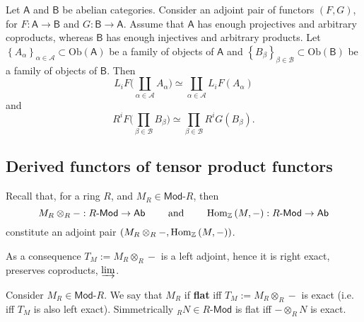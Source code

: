 \begin{prop}
	Let $\mathsf{A}$ and $\mathsf{B}$ be abelian categories.
	Consider an adjoint pair of functors $\left(F, G\right)$,
	for $F: \mathsf{A} \to \mathsf{B}$ and $G: \mathsf{B} \to \mathsf{A}$.
	Assume that $\mathsf{A}$ has enough projectives and arbitrary coproducts,
	whereas $\mathsf{B}$ has enough injectives and arbitrary products.
	Let $\left\{ A_\alpha \right\}_{\alpha \in \mathcal{A}} \subset \mathrm{Ob} \left(\mathsf{A}\right)$
	be a family of objects of $\mathsf{A}$
	and $\left\{ B_\beta \right\}_{\beta \in \mathcal{B}} \subset \mathrm{Ob} \left(\mathsf{B}\right)$
	be a family of objects of $\mathsf{B}$.
	Then
	\begin{equation}
		L_iF \bigg( \coprod_{\alpha \in \mathcal{A}} A_\alpha \bigg) \simeq
		\coprod_{\alpha \in \mathcal{A}} L_i F(A_\alpha)
	\end{equation} 
	and
	\begin{equation}
		R^iF \bigg( \prod_{\beta \in \mathcal{B}} B_\beta \bigg) \simeq
		\prod_{\beta \in \mathcal{B}} R^iG \left( B_\beta \right)
	.\end{equation} 
\end{prop} 

\subsection{Derived functors of tensor product functors}
Recall that, for a ring $R$, and $M_R \in \mathsf{Mod}\text{-}R$,
then 
\begin{equation}
M_R \otimes_R - : R\text{-}\mathsf{Mod} \to \mathsf{Ab}
\qquad \text{ and } \qquad
\mathrm{Hom}_{\mathbb{Z}}\left( M, - \right): R\text{-}\mathsf{Mod} \to \mathsf{Ab}
\end{equation} 
constitute an adjoint pair $\left(M_R \otimes_R -, \mathrm{Hom}_{ \mathbb{Z}}\left( M, - \right)\right)$.

As a consequence $T_M := M_R \otimes_R -$ is a left adjoint, hence it is
right exact, preserves coproducts, $\varinjlim$.

\begin{defn}
	Consider $M_R \in \mathsf{Mod}\text{-}R$.
	We say that $M_R$ if \textbf{flat} iff $T_M := M_R \otimes_R -$ is exact
	(i.e. iff $T_M$ is also left exact).
	Simmetrically ${}_RN \in R\text{-}\mathsf{Mod}$ is flat iff $- \otimes_R N$ is exact.
\end{defn}

